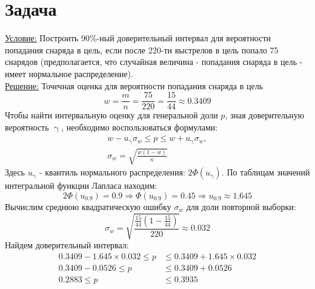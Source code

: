 \documentclass[a4paper,12pt]{article} %
\begin{document}
\newpage
\section{Задача}
\underline{Условие:} Построить 90\%-ный доверительный интервал для вероятности
попадания снаряда в цель, если после 220-ти выстрелов в цель попало 75 снарядов
(предполагается, что случайная величина - попадания снаряда в цель - имеет
нормальное распределение).\\
\underline{Решение:} Точечная оценка для вероятности попадания снаряда в цель
\[
  w = \frac{m}{n} = \frac{75}{220} = \frac{15}{44} \approx 0.3409
\]
Чтобы найти интервальную оценку для генеральной доли \(p\), зная доверительную
вероятность \(\upgamma\), необходимо воспользоваться формулами:
\begin{align}
  w - u_\upgamma\sigma_w \leqslant p\leqslant w+u_\upgamma\sigma_w,\\
  \sigma_w = \sqrt{\frac{w(1-w)}{n}}
\end{align}
Здесь \(u_\upgamma\) - квантиль нормального распределения: \(2\Phi(u_\upgamma)\).
По таблицам значений интегральной функции Лапласа находим:
\[
  2\Phi(u_{0.9}) = 0.9 \Rightarrow \Phi(u_{0.9}) = 0.45 \Rightarrow u_{0.9} \approx 1.645
\]
Вычислим среднюю квадратическую ошибку \(\sigma_w\) для доли повторной
выборки:
\[
  \sigma_w = \sqrt{\frac{\frac{15}{44}\left(1-\frac{15}{44}\right)}{220}} \approx 0.032
\]
Найдем доверительный интервал:
\begin{align}
  0.3409 - 1.645 \times 0.032 \leqslant p& \leqslant  0.3409 + 1.645 \times 0.032\\
  0.3409 - 0.0526 \leqslant p& \leqslant 0.3409 + 0.0526\\
  0.2883 \leqslant p& \leqslant 0.3935
\end{align}

\newpage
\end{document}
